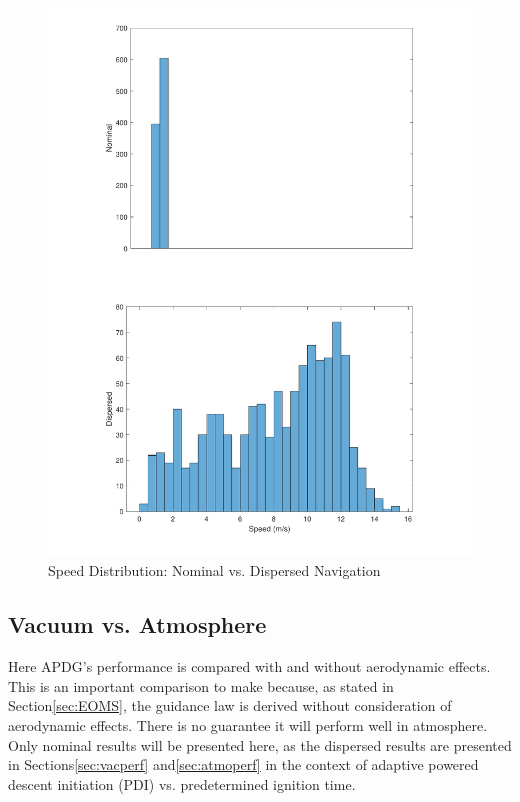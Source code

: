 \begin{figure}[H]
	\centering
	\begin{minipage}{4.3 in}
		\includegraphics[width=\linewidth]{Figures/hspdnavvsnonav.pdf}
		\caption{Speed Distribution: Nominal vs. Dispersed Navigation \label{fig:hspdnavvsnonav} }
	\end{minipage}
\end{figure}

\subsection{Vacuum vs. Atmosphere} \label{sec:atmovsvac}
Here APDG's performance is compared with and without aerodynamic effects. This is an important comparison to make because, as stated in Section\:\ref{sec:EOMS}, the guidance law is derived without consideration of aerodynamic effects. There is no guarantee it will perform well in atmosphere. Only nominal results will be presented here, as the dispersed results are presented in Sections\:\ref{sec:vacperf} and\:\ref{sec:atmoperf} in the context of adaptive powered descent initiation (PDI) vs. predetermined ignition time.

